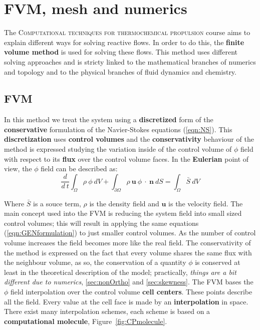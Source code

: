 \section{FVM, mesh and numerics}
    \setcounter{page}{1}
    \renewcommand{\thepage}{A-\arabic{page}}
    
    The \textsc{Computational techniques for thermochemical propulsion} course aims to explain different ways for solving reactive flows. In order to do this, the \textbf{finite volume method} is used for solving these flows. This method uses different solving approaches and is stricty linked to the mathematical branches of numerics and topology and to the physical branches of fluid dynamics and chemistry. 

    \subsection{FVM}    
    In this method we treat the system using a \textbf{discretized} form of the \textbf{conservative} formulation of the Navier-Stokes equations (\ref{eqn:NS}). This \textbf{discretization} uses \textbf{control volumes} and the \textbf{conservativity} behaviour of the method is expressed studying the variation inside of the control volume of $\phi$ field with respect to its \textbf{flux} over the control volume faces. In the \textbf{Eulerian} point of view, the $\phi$ field can be described as: 
    \begin{equation}
        \frac{d}{d \ t} \int_{\Omega} \rho \ \phi \ dV + \int_{\partial \Omega} \rho \ \boldsymbol{u} \ \phi \ \cdot \ \boldsymbol{n} \ dS  = \int_{\Omega} \bar{S} \ dV 
        \label{eqn:GENformulation}
    \end{equation}
   
   \noindent Where $\bar{S}$ is a souce term, $\rho$ is the density field and $\boldsymbol{u}$ is the velocity field. The main concept used into the FVM is reducing the system field into small sized control volumes; this will result in applying the same equations (\ref{eqn:GENformulation}) to just smaller control volumes. As the number of control volume increases the field becomes more like the real field. The conservativity of the method is expressed on the fact that every volume shares the same flux with the neighbour volume, as so, the conservation of a quantity $\phi$ is conserved at least in the theoretical description of the model; practically, \textit{things are a bit different due to numerics}, \ref{sec:nonOrtho} and \ref{sec:skewness}. 
   \newline The FVM bases the $\phi$ field interpolation over the control volume \textbf{cell centers}. These points describe all the field. Every value at the cell face is made by an \textbf{interpolation} in space. There exist many interpolation schemes, each scheme is based on a \textbf{computational molecule}, Figure~\ref{fig:CPmolecule}.
    
